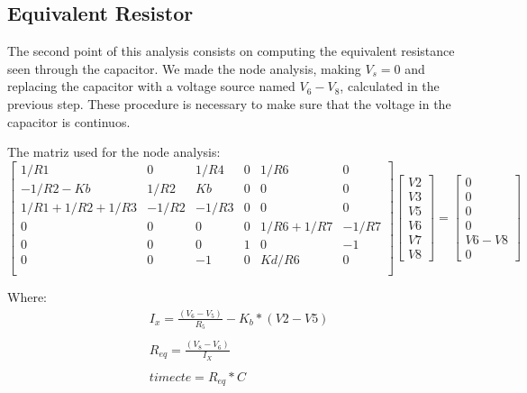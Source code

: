 \subsection{Equivalent Resistor} 

The second point of this analysis consists on computing the equivalent resistance seen through the capacitor. We made the node analysis, making $V_s=0$ and replacing the capacitor with a voltage source named $V_6-V_8$, calculated in the previous step.
These procedure is necessary to make sure that the voltage in the capacitor is continuos.   

The matriz used for the node analysis:
$$
\begin{bmatrix} 
   1/R1           & 0       & 1/R4    & 0    & 1/R6         & 0       \\
  -1/R2-Kb        & 1/R2    & Kb      & 0    & 0            & 0       \\
   1/R1+1/R2+1/R3 & -1/R2   & -1/R3   & 0    & 0            & 0       \\
   0              & 0       & 0       & 0    & 1/R6 + 1/R7  & -1/R7   \\
   0              & 0       & 0       & 1    & 0            & -1      \\
   0              & 0       & -1      & 0    & Kd/R6        & 0       \\
\end {bmatrix} 
\begin{bmatrix}
V2 \\ V3 \\ V5 \\ V6 \\ V7 \\ V8
\end {bmatrix} 
=
\begin{bmatrix} 
0 \\ 0 \\ 0 \\ 0 \\ V6-V8 \\ 0
\end {bmatrix} 
$$ 

Where: 
\begin{align*} 
&I_x=\frac{(V_6-V_5)}{R_5} - K_b*(V2-V5)\\
\\    
&R_{eq}=\frac{(V_8-V_6)}{I_X}\\
\\
&timecte=R_{eq}*C\\
\end{align*}


